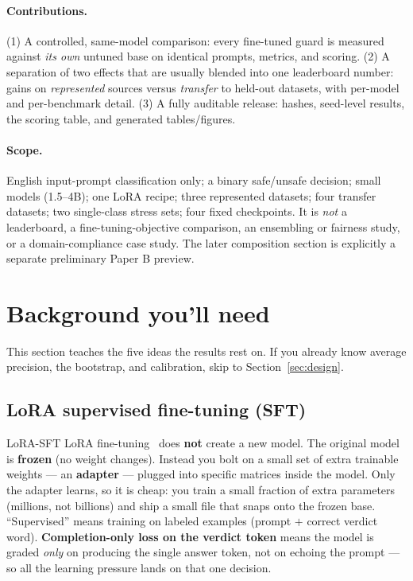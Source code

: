 \documentclass[11pt]{article}
\begin{document}
\paragraph{Contributions.} (1) A controlled, same-model comparison: every fine-tuned guard is
measured against \emph{its own} untuned base on identical prompts, metrics, and scoring.
(2) A separation of two effects that are usually blended into one leaderboard number: gains
on \emph{represented} sources versus \emph{transfer} to held-out datasets, with per-model and
per-benchmark detail. (3) A fully auditable release: hashes, seed-level results, the scoring
table, and generated tables/figures.

\paragraph{Scope.} English input-prompt classification only; a binary safe/unsafe decision;
small models (1.5--4B); one LoRA recipe; three represented datasets; four transfer datasets;
two single-class stress sets; four fixed checkpoints. It is \emph{not} a leaderboard, a
fine-tuning-objective comparison, an ensembling or fairness study, or a domain-compliance
case study. The later composition section is explicitly a separate preliminary Paper B preview.

\section{Background you'll need}
This section teaches the five ideas the results rest on. If you already know average
precision, the bootstrap, and calibration, skip to Section~\ref{sec:design}.

\subsection{LoRA supervised fine-tuning (SFT)}
\begin{background}{LoRA-SFT}
\small
LoRA fine-tuning~\cite{hu2021lora} does \textbf{not} create a new model. The original model is \textbf{frozen}
(no weight changes). Instead you bolt on a small set of extra trainable weights --- an
\textbf{adapter} --- plugged into specific matrices inside the model. Only the adapter learns,
so it is cheap: you train a small fraction of extra parameters (millions, not billions) and
ship a small file that snaps onto the frozen base. ``Supervised'' means training on labeled
examples (prompt $+$ correct verdict word). \textbf{Completion-only loss on the verdict
token} means the model is graded \emph{only} on producing the single answer token, not on
echoing the prompt --- so all the learning pressure lands on that one decision.
\end{background}
\end{document}
